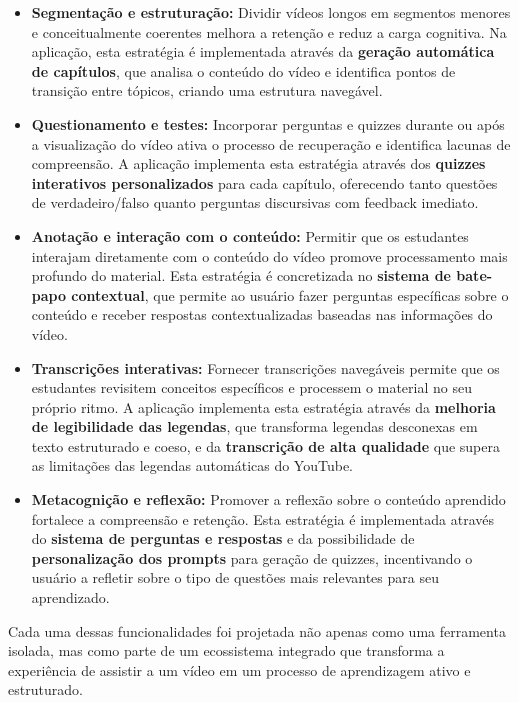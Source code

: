 \documentclass[tcc,capa]{texufpel}
\begin{document}
\begin{itemize}
    \item \textbf{Segmentação e estruturação:} Dividir vídeos longos em segmentos menores e conceitualmente coerentes melhora a retenção e reduz a carga cognitiva. Na aplicação, esta estratégia é implementada através da \textbf{geração automática de capítulos}, que analisa o conteúdo do vídeo e identifica pontos de transição entre tópicos, criando uma estrutura navegável.
    
    \item \textbf{Questionamento e testes:} Incorporar perguntas e quizzes durante ou após a visualização do vídeo ativa o processo de recuperação e identifica lacunas de compreensão. A aplicação implementa esta estratégia através dos \textbf{quizzes interativos personalizados} para cada capítulo, oferecendo tanto questões de verdadeiro/falso quanto perguntas discursivas com feedback imediato.
    
    \item \textbf{Anotação e interação com o conteúdo:} Permitir que os estudantes interajam diretamente com o conteúdo do vídeo promove processamento mais profundo do material. Esta estratégia é concretizada no \textbf{sistema de bate-papo contextual}, que permite ao usuário fazer perguntas específicas sobre o conteúdo e receber respostas contextualizadas baseadas nas informações do vídeo.
    
    \item \textbf{Transcrições interativas:} Fornecer transcrições navegáveis permite que os estudantes revisitem conceitos específicos e processem o material no seu próprio ritmo. A aplicação implementa esta estratégia através da \textbf{melhoria de legibilidade das legendas}, que transforma legendas desconexas em texto estruturado e coeso, e da \textbf{transcrição de alta qualidade} que supera as limitações das legendas automáticas do YouTube.
    
    \item \textbf{Metacognição e reflexão:} Promover a reflexão sobre o conteúdo aprendido fortalece a compreensão e retenção. Esta estratégia é implementada através do \textbf{sistema de perguntas e respostas} e da possibilidade de \textbf{personalização dos prompts} para geração de quizzes, incentivando o usuário a refletir sobre o tipo de questões mais relevantes para seu aprendizado.
\end{itemize}

Cada uma dessas funcionalidades foi projetada não apenas como uma ferramenta isolada, mas como parte de um ecossistema integrado que transforma a experiência de assistir a um vídeo em um processo de aprendizagem ativo e estruturado.
\end{document}

